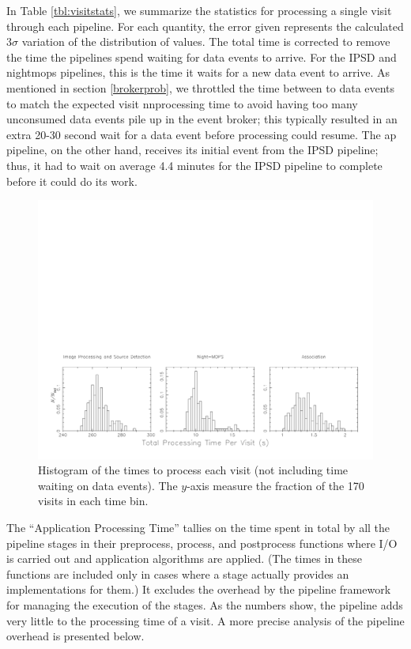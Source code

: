 In Table \ref{tbl:visitstats}, we summarize the statistics for processing
a single visit through each pipeline.  For each quantity, the error
given represents the calculated $3\sigma$ variation of the
distribution of values.  The total time is corrected to remove the
time the pipelines spend waiting for data events to arrive.  For the
IPSD and nightmops pipelines, this is the time it waits for a new data
event to arrive.  As mentioned in section \ref{brokerprob}, we
throttled the time between to data events to match the expected visit
nnprocessing time to avoid having too many unconsumed data events pile
up in the event broker; this typically resulted in an extra 20-30
second wait for a data event before processing could resume.  The ap
pipeline, on the other hand, receives its initial event from the IPSD
pipeline; thus, it had to wait on average 4.4 minutes for the IPSD
pipeline to complete before it could do its work.

\begin{figure}[htbp]
\begin{center}
\includegraphics[width=\textwidth]{images/visitdist.pdf}
\caption{Histogram of the times to process each visit (not including
  time waiting on data events).  The $y$-axis measure the fraction of
  the 170 visits in each time bin.  
\label{fig:visitdist}}
\end{center}
\end{figure}


The ``Application Processing Time'' tallies on the time spent in total
by all the pipeline stages in their preprocess, process, and
postprocess functions where I/O is carried out and application
algorithms are applied.  (The times in these functions are included
only in cases where a stage actually provides an implementations for
them.)  It excludes the overhead by the pipeline framework for
managing the execution of the stages.  As the numbers show, the
pipeline adds very little to the processing time of a visit.  A more
precise analysis of the pipeline overhead is presented below.  

